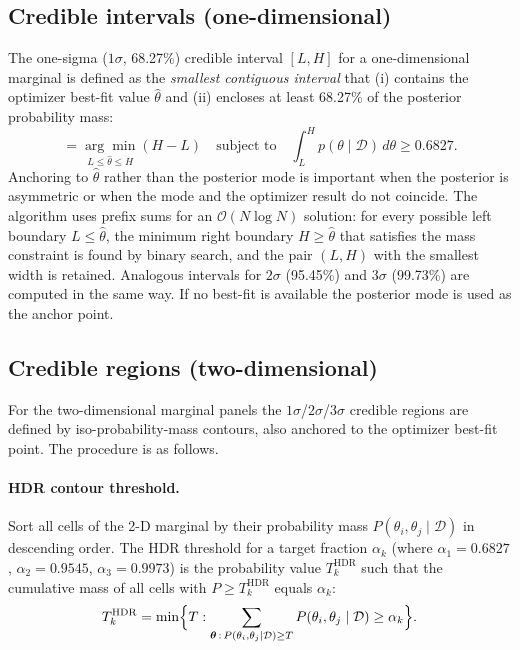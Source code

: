 \documentclass[a4paper,11pt]{article}
\newcommand{\btheta}{\boldsymbol{\theta}}
\begin{document}
\subsection{Credible intervals (one-dimensional)}
\label{sec:ci_1d}

The one-sigma ($1\sigma$, 68.27\%) credible interval $[L, H]$ for a
one-dimensional marginal is defined as the \emph{smallest contiguous interval}
that (i) contains the optimizer best-fit value $\hat\theta$ and (ii) encloses
at least 68.27\% of the posterior probability mass:
\begin{equation}
  [L,H] = \underset{L \le \hat\theta \le H}{\arg\min}(H - L)
  \quad \text{subject to} \quad
  \int_L^H p(\theta\mid\mathcal{D})\,d\theta \geq 0.6827.
  \label{eq:ci_1d}
\end{equation}
Anchoring to $\hat\theta$ rather than the posterior mode is important when
the posterior is asymmetric or when the mode and the optimizer result do not
coincide. The algorithm uses prefix sums for an $\mathcal{O}(N\log N)$
solution: for every possible left boundary $L \le \hat\theta$, the minimum
right boundary $H \ge \hat\theta$ that satisfies the mass constraint is found
by binary search, and the pair $(L, H)$ with the smallest width is retained.
Analogous intervals for $2\sigma$ (95.45\%) and $3\sigma$ (99.73\%) are
computed in the same way.  If no best-fit is available the posterior mode
is used as the anchor point.

\subsection{Credible regions (two-dimensional)}
\label{sec:ci_2d}

For the two-dimensional marginal panels the $1\sigma$/$2\sigma$/$3\sigma$
credible regions are defined by iso-probability-mass contours, also anchored
to the optimizer best-fit point. The procedure is as follows.

\paragraph{HDR contour threshold.}
Sort all cells of the 2-D marginal by their probability mass $P(\theta_i,
\theta_j\mid\mathcal{D})$ in descending order. The HDR threshold for a target
fraction $\alpha_k$ (where $\alpha_1 = 0.6827$, $\alpha_2 = 0.9545$,
$\alpha_3 = 0.9973$) is the probability value $T_k^\mathrm{HDR}$ such that
the cumulative mass of all cells with $P \ge T_k^\mathrm{HDR}$ equals
$\alpha_k$:
\begin{equation}
  T_k^\mathrm{HDR}
  = \min\Bigl\{T : \sum_{\btheta\,:\,P(\theta_i,\theta_j|\mathcal{D})\ge T}
                    P(\theta_i,\theta_j\mid\mathcal{D}) \ge \alpha_k \Bigr\}.
\end{equation}
\end{document}
